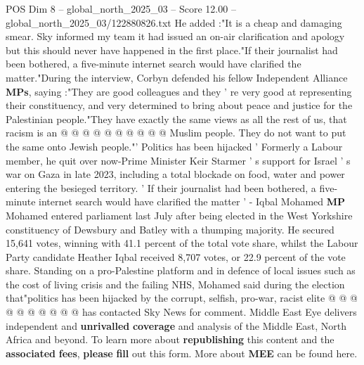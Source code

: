 \begin{textsample}{POS Dim 8 – global\_north\_2025\_03 – Score 12.00 – global\_north\_2025\_03/122880826.txt}
He added :"It is a cheap and damaging smear.
Sky informed my team it had issued an on-air clarification and apology but this should never have happened in the first place."If their journalist had been bothered, a five-minute internet search would have clarified the matter."During the interview, Corbyn defended his fellow Independent Alliance \textbf{MPs}, saying :"They are good colleagues and they ' re very good at representing their constituency, and very determined to bring about peace and justice for the Palestinian people."They have exactly the same views as all the rest of us, that racism is an @ @ @ @ @ @ @ @ @ @ Muslim people.
They do not want to put the same onto Jewish people."' Politics has been hijacked ' Formerly a Labour member, he quit over now-Prime Minister Keir Starmer ' s support for Israel ' s war on Gaza in late 2023, including a total blockade on food, water and power entering the besieged territory. ' If their journalist had been bothered, a five-minute internet search would have clarified the matter ' - Iqbal Mohamed \textbf{MP} Mohamed entered parliament last July after being elected in the West Yorkshire constituency of Dewsbury and Batley with a thumping majority.
He secured 15,641 votes, winning with 41.1 percent of the total vote share, whilst the Labour Party candidate Heather Iqbal received 8,707 votes, or 22.9 percent of the vote share.
Standing on a pro-Palestine platform and in defence of local issues such as the cost of living crisis and the failing NHS, Mohamed said during the election that"politics has been hijacked by the corrupt, selfish, pro-war, racist elite @ @ @ @ @ @ @ @ @ @ has contacted Sky News for comment.
Middle East Eye delivers independent and \textbf{unrivalled} \textbf{coverage} and analysis of the Middle East, North Africa and beyond.
To learn more about \textbf{republishing} this content and the \textbf{associated} \textbf{fees}, \textbf{please} \textbf{fill} out this form.
More about \textbf{MEE} can be found here.

\end{textsample}

